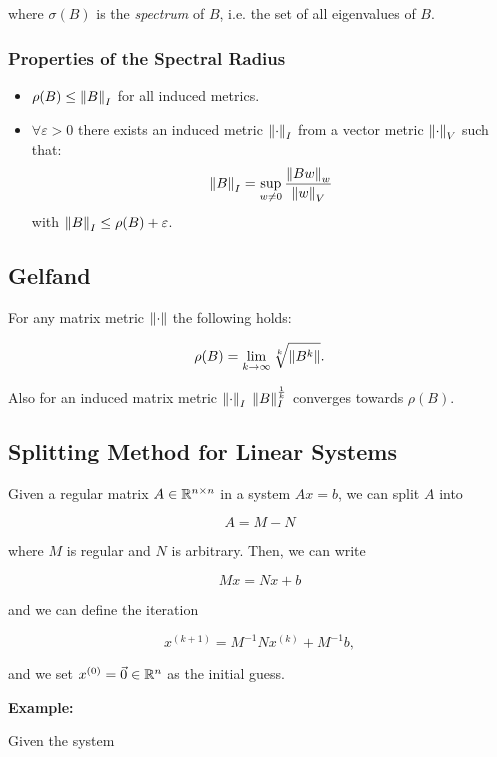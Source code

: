 where \(\sigma(B)\) is the \emph{spectrum} of \(B\), i.e. the set of all eigenvalues of \(B\).

\subsubsection*{Properties of the Spectral Radius}

\begin{itemize}

    \item \(\rho(B) \le \left\| B \right\|_I\) for all induced metrics.

    \item \(\forall \varepsilon > 0\) there exists an induced metric \(\left\| \cdot \right\|_I\) from a vector metric \(\left\| \cdot \right\|_V\) such that:
    \[
        \left\| B \right\|_I = \sup_{w \ne 0} \frac{\left\| Bw \right\|_w}{\left\| w \right\|_V}
    \]
    with \(\left\| B \right\|_I \le \rho(B) + \varepsilon\).

\end{itemize}

\subsection{Gelfand}

For any matrix metric \(\left\| \cdot \right\|\) the following holds:

\[
    \rho(B) = \lim_{k \to \infty} \sqrt[k]{\left\| B^k \right\|}.
\]

Also for an induced matrix metric \(\left\| \cdot \right\|_I\) \(\left\| B \right\|_I^{\frac{1}{k}}\) converges towards \(\rho(B)\).
\subsection{Splitting Method for Linear Systems}

Given a regular matrix \(A \in \mathbb{R}^{n \times n}\) in a system \(Ax = b\), we can split \(A\) into 

\[
    A = M - N
\]

where \(M\) is regular and \(N\) is arbitrary. Then, we can write

\[
    Mx = Nx + b
\]

and we can define the iteration 

\[
    x^{(k + 1)} = M^{-1}Nx^{(k)} + M^{-1}b,
\]

and we set \(x^{(0)} = \vec{0} \in \mathbb{R}^n\) as the initial guess.

\textbf{Example:}

Given the system 

